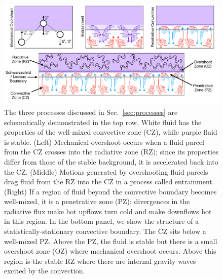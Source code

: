 \documentclass[linenumbers]{aastex631}
\begin{document}
\begin{figure}[t!]
\centering
\includegraphics[width=\textwidth]{processes_and_structure_figure.pdf}
\caption{
    The three processes discussed in Sec.~\ref{sec:processes} are schematically demonstrated in the top row.
    White fluid has the properties of the well-mixed convective zone (CZ), while purple fluid is stable.
    (Left) Mechanical overshoot occurs when a fluid parcel from the CZ crosses into the radiative zone (RZ); since its properties differ from those of the stable background, it is accelerated back into the CZ.
    (Middle) Motions generated by overshooting fluid parcels drag fluid from the RZ into the CZ in a process called entrainment.
    (Right) If a region of fluid beyond the convective boundary becomes well-mixed, it is a penetrative zone (PZ); divergences in the radiative flux make hot upflows turn cold and make downflows hot in this region.
    In the bottom panel, we show the structure of a statistically-stationary convective boundary.
    The CZ sits below a well-mixed PZ.
    Above the PZ, the fluid is stable but there is a small overshoot zone (OZ) where mechanical overshoot occurs.
    Above this region is the stable RZ where there are internal gravity waves excited by the convection.
\label{fig:schema}
}
\end{figure}










\end{document}

